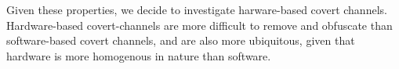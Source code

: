 Given these properties, we decide to investigate harware-based covert channels.
Hardware-based covert-channels are more difficult to remove and obfuscate than
software-based covert channels, and are also more ubiquitous, given that
hardware is more homogenous in nature than software. 



